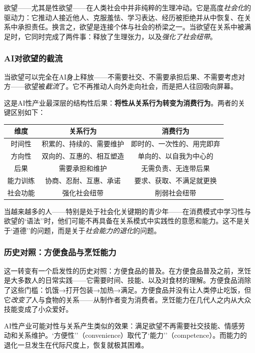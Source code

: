 \documentclass[12pt,a4paper]{ctexart}
\begin{document}
欲望——尤其是性欲望——在人类社会中并非纯粹的生理冲动。它是高度\emph{社会化}的驱动力：它推动人接近他人、克服羞怯、学习表达、经历被拒绝并从中恢复、在关系中承担责任。换言之，欲望是连接个体与社会的桥梁之一。当欲望在关系中被满足时，它同时完成了两件事：释放了生理张力，以及\emph{强化了社会纽带}。

\subsubsection{AI对欲望的截流}

当欲望可以完全在AI身上释放——不需要社交、不需要承担后果、不需要考虑对方——欲望被\textit{截流}了。它不再推动人向外走向社会，而是把人往回吸向屏幕。

这是AI性产业最深层的结构性后果：\textbf{将性从关系行为转变为消费行为}。两者的关键区别如下：

\begin{center}
\begin{tabular}{c|c|c}
\hline
维度 & 关系行为 & 消费行为 \\
\hline
时间性 & 积累的、持续的、需要维护 & 即时的、一次性的、用完即弃 \\
方向性 & 双向的、互惠的、相互塑造 & 单向的、以自我为中心的 \\
后果 & 需要承担和维护 & 无需负责、无连带后果 \\
能力训练 & 协商、忍耐、互惠、承诺 & 要求、获取、不满足就更换 \\
社会功能 & 强化社会纽带 & 削弱社会纽带 \\
\hline
\end{tabular}
\end{center}

当越来越多的人——特别是处于社会化关键期的青少年——在消费模式中学习性与欲望的`语法''时，他们可能不再具备在关系模式中实践性的意愿和能力。这不是关于`道德''的问题，而是关于\textit{社会能力的退化}的问题。

\subsubsection{历史对照：方便食品与烹饪能力}

这一转变有一个启发性的历史对照：方便食品的普及。在方便食品普及之前，烹饪是大多数人的日常实践——它需要时间、技能、以及对食材的理解。方便食品消除了这些门槛：饥饿→打开包装→加热→满足。方便食品并没有让人类停止吃饭，但它\textit{改变了}人与食物的关系——从制作者变为消费者。烹饪能力在几代人之内从大众技能变成了小众爱好。

AI性产业可能对性与关系产生类似的效果：满足欲望不再需要社交技能、情感劳动和关系维护。`方便性''（convenience）取代了`能力''（competence）。而能力的退化一旦发生在代际尺度上，恢复就极其困难。
\end{document}
